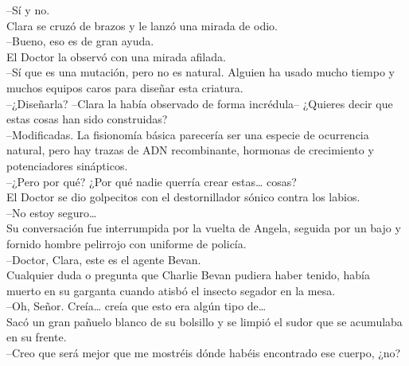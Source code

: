 --Sí y no.\\
Clara se cruzó de brazos y le lanzó una mirada de odio.\\
--Bueno, eso es de gran ayuda.\\
El Doctor la observó con una mirada afilada.\\
--Sí que es una mutación, pero no es natural. Alguien ha usado mucho
tiempo y muchos equipos caros para diseñar esta criatura.\\
--¿Diseñarla? --Clara la había observado de forma incrédula-- ¿Quieres
decir que estas cosas han sido construidas?\\
--Modificadas. La fisionomía básica parecería ser una especie de
ocurrencia natural, pero hay trazas de ADN recombinante, hormonas de
crecimiento y potenciadores sinápticos.\\
--¿Pero por qué? ¿Por qué nadie querría crear estas\ldots{} cosas?\\
El Doctor se dio golpecitos con el destornillador sónico contra los
labios.\\
--No estoy seguro\ldots{}\\
Su conversación fue interrumpida por la vuelta de Angela, seguida por un
bajo y fornido hombre pelirrojo con uniforme de policía.\\
--Doctor, Clara, este es el agente Bevan.\\
Cualquier duda o pregunta que Charlie Bevan pudiera haber tenido, había
muerto en su garganta cuando atisbó el insecto segador en la mesa.\\
--Oh, Señor. Creía\ldots{} creía que esto era algún tipo de\ldots{}\\
Sacó un gran pañuelo blanco de su bolsillo y se limpió el sudor que se
acumulaba en su frente.\\
--Creo que será mejor que me mostréis dónde habéis encontrado ese
cuerpo, ¿no?\\

